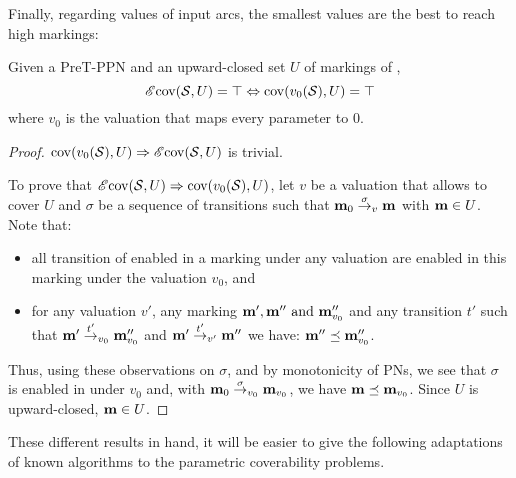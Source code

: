 Finally, regarding values of input arcs, the smallest values are the best to reach high markings:

\begin{theo}
  \label{theo:pre-zero-val}
  Given a PreT-\ac{PPN} \SPTPm and an upward-closed set $U$ of markings of \PPN, \[\operatorname{\mathscr{E}cov}(\mathcal{S}, U) = \top \Leftrightarrow \operatorname{cov}(v_0(\mathcal{S}), U) = \top\] where $v_0$ is the valuation that maps every parameter to $0$.
\end{theo}

\begin{proof}
  $\operatorname{cov}(v_0(\mathcal{S}), U) \Rightarrow \operatorname{\mathscr{E}cov}(\mathcal{S}, U)$ is trivial.

  To prove that $\operatorname{\mathscr{E}cov}(\mathcal{S}, U) \Rightarrow \operatorname{cov}(v_0(\mathcal{S}), U)$, let $v$ be a valuation that allows to cover $U$ and $\sigma$ be a sequence of transitions such that $\mathbf{m}_0 \stackrel{\sigma}{\to}_v \mathbf{m}$ with $\mathbf{m} \in U$.
  Note that:
  \begin{itemize}
    \item all transition of \PPN enabled in a marking under any valuation are enabled in this marking under the valuation $v_0$, and
    \item for any valuation $v'$, any marking $\mathbf{m}', \mathbf{m}'' \text{ and } \mathbf{m}''_{v_0}$ and any transition $t'$ such that $\mathbf{m}' \stackrel{t'}{\to}_{v_0} \mathbf{m}''_{v_0}$ and $\mathbf{m}' \stackrel{t'}{\to}_{v'} \mathbf{m}''$ we have: $\mathbf{m}'' \preceq \mathbf{m}''_{v_0}$.
  \end{itemize}

  Thus, using these observations on $\sigma$, and by monotonicity of \acp{PN}, we see that $\sigma$ is enabled in \mari under $v_0$ and, with $\mathbf{m}_0 \stackrel{\sigma}{\to}_{v_0} \mathbf{m}_{v_0}$, we have $\mathbf{m} \preceq \mathbf{m}_{v_0}$.
  Since $U$ is upward-closed, $\mathbf{m} \in U$.
\end{proof}

These different results in hand, it will be easier to give the following adaptations of known algorithms to the parametric coverability problems.

